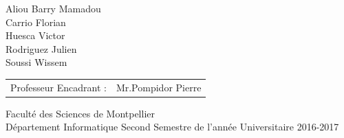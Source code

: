 \begin{titlepage}
\begin{center}
    
    {\huge Aliou Barry Mamadou} \\[0.2cm]
    {\huge Carrio Florian} \\[0.2cm]
    {\huge Huesca Victor} \\[0.2cm]
    {\huge Rodriguez Julien}\\[0.2cm]
    {\huge Soussi Wissem} \\[1cm]
    
    \begin{tabular}[hc]{>{\huge}l >{\huge}l}
      Professeur Encadrant : & Mr.Pompidor Pierre 
    \end{tabular}
    
    \vfill  %
    
    \Large 
    {
        Faculté des Sciences de Montpellier\\
        Département Informatique
        Second Semestre de l'année Universitaire 2016-2017
    }
     
    \end{center}
\end{titlepage}
